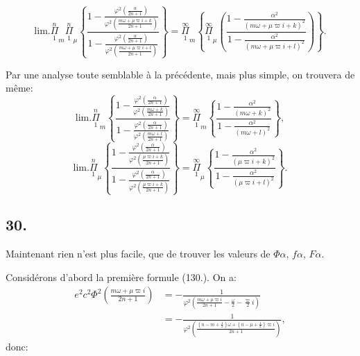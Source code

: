 \documentclass{article}
\begin{document}
\[ \text{lim.}\overset{n}{\underset{1}{\Pi}}_{m}\overset{n}{\underset{1}{\Pi}}_{\mu}\left\{\frac{1-\frac{\varphi^{2}\left(\frac{\alpha}{2n+1}\right)}{\varphi^{2}\left(\frac{m\omega+\mu\varpi i+k}{2n+1}\right)}}{1-\frac{\varphi^{2}\left(\frac{\alpha}{2n+1}\right)}{\varphi^{2}\left(\frac{m\omega+\mu\varpi i+l}{2n+1}\right)}}\right\}=\overset{\infty}{\underset{1}{\Pi}}_{m}\left\{\overset{\infty}{\underset{1}{\Pi}}_{\mu}\left(\frac{1-\frac{\alpha^{2}}{(m\omega+\mu\varpi i+k)^{2}}}{1-\frac{\alpha^{2}}{(m\omega+\mu\varpi i+l)^{2}}}\right)\right\}. \tag{172.} \]

Par une analyse toute semblable à la précédente, mais plus simple, on trouvera de même:
\[ \text{lim.}\overset{n}{\underset{1}{\Pi}}_{m}\left\{\frac{1-\frac{\varphi^{2}\left(\frac{\alpha}{2n+1}\right)}{\varphi^{2}\left(\frac{m\omega+k}{2n+1}\right)}}{1-\frac{\varphi^{2}\left(\frac{\alpha}{2n+1}\right)}{\varphi^{2}\left(\frac{m\omega+l}{2n+1}\right)}}\right\}=\overset{\infty}{\underset{1}{\Pi}}_{m}\left\{\frac{1-\frac{\alpha^{2}}{(m\omega+k)^{2}}}{1-\frac{\alpha^{2}}{(m\omega+l)^{2}}}\right\}, \tag{173.} \]
\[ \text{lim.}\overset{n}{\underset{1}{\Pi}}_{\mu}\left\{\frac{1-\frac{\varphi^{2}\left(\frac{\alpha}{2n+1}\right)}{\varphi^{2}\left(\frac{\mu\varpi i+k}{2n+1}\right)}}{1-\frac{\varphi^{2}\left(\frac{\alpha}{2n+1}\right)}{\varphi^{2}\left(\frac{\mu\varpi i+k}{2n+1}\right)}}\right\}=\overset{\infty}{\underset{1}{\Pi}}_{\mu}\left\{\frac{1-\frac{\alpha^{2}}{(\mu\varpi i+k)^{2}}}{1-\frac{\alpha^{2}}{(\mu\varpi i+l)^{2}}}\right\}. \tag{174.} \]

\subsection*{30.}

Maintenant rien n'est plus facile, que de trouver les valeurs de $\Phi\alpha$, $f\alpha$, $F\alpha$.

Considérons d'abord la première formule (130.). On a:
\[ \begin{aligned}e^{2}c^{2}\Phi^{2}\left(\frac{m\omega+\mu\varpi i}{2n+1}\right)&=-\frac{1}{\varphi^{2}\left(\frac{m\omega+\mu\varpi i}{2n+1}-\frac{\omega}{2}-\frac{\varpi}{2}i\right)}\\ &=-\frac{1}{\varphi^{2}\left(\frac{(n-m+\tfrac{1}{2})\omega+(n-\mu+\tfrac{1}{2})\varpi i}{2n+1}\right)},\end{aligned} \]
donc:
\end{document}
